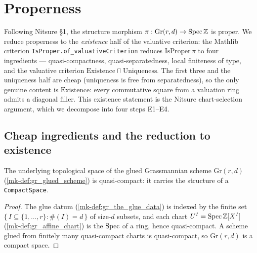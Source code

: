 \section{Properness}
\label{mk-sec:gr_proper}

Following Nitsure \S 1, the structure morphism \(\pi : \mathrm{Gr}(r,d) \to \operatorname{Spec}
\mathbb{Z}\) is proper. We reduce properness to the \emph{existence} half of the
valuative criterion: the Mathlib criterion \texttt{IsProper.of\_valuativeCriterion}
reduces \(\mathrm{IsProper}\,\pi\) to four ingredients --- quasi-compactness,
quasi-separatedness, local finiteness of type, and the valuative criterion
\(\mathrm{Existence} \sqcap \mathrm{Uniqueness}\). The first three and the
uniqueness half are cheap (uniqueness is free from separatedness), so the only
genuine content is \(\mathrm{Existence}\): every commutative square from a
valuation ring admits a diagonal filler. This existence statement is the Nitsure
chart-selection argument, which we decompose into four steps E1--E4.

\subsection*{Cheap ingredients and the reduction to existence}

\begin{lemma}\label{mk-lem:gr_compactSpace_scheme}
  \leanok

  The underlying topological space of the glued Grassmannian scheme
  \(\mathrm{Gr}(r,d)\) (\ref{mk-def:gr_glued_scheme}) is quasi-compact: it carries the
  structure of a \texttt{CompactSpace}.
\end{lemma}
\begin{proof}
  \leanok
  The glue datum (\ref{mk-def:gr_the_glue_data}) is indexed by the finite set
  \(\{\, I \subseteq \{1,\dots,r\} : \#(I) = d \,\}\) of size-\(d\) subsets, and
  each chart \(U^I = \operatorname{Spec} \mathbb{Z}[X^I]\) (\ref{mk-def:gr_affine_chart}) is the
  \(\operatorname{Spec}\) of a ring, hence quasi-compact. A scheme glued from finitely many
  quasi-compact charts is quasi-compact, so \(\mathrm{Gr}(r,d)\) is a compact
  space.
\end{proof}

